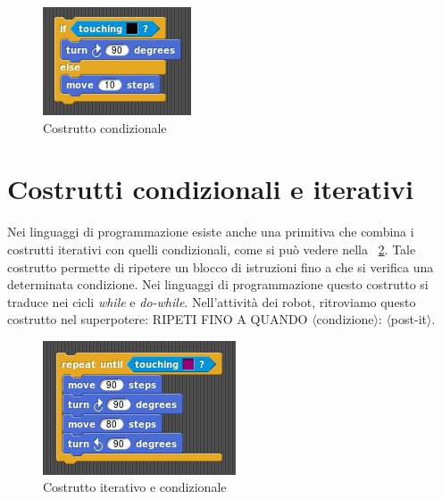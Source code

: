 \documentclass[12pt]{article}
\begin{document}
\begin{figure}
\centering
\includegraphics[scale=0.7]{img/if.jpg}
\caption{Costrutto condizionale}
\label{fig:if}
\end{figure}
%
%
\section{Costrutti condizionali e iterativi}
Nei linguaggi di programmazione esiste anche una primitiva che combina i costrutti iterativi con quelli condizionali, come si può vedere nella \figurename~\ref{fig:while}. Tale costrutto permette di ripetere un blocco di istruzioni fino a che si verifica una determinata condizione. Nei linguaggi di programmazione questo costrutto si traduce nei cicli \textit{while} e \textit{do-while}. Nell'attività dei robot, ritroviamo questo costrutto nel superpotere: RIPETI FINO A QUANDO $\langle$condizione$\rangle$:  $\langle$post-it$\rangle$.

\begin{figure}
\centering
\includegraphics[scale=0.7]{img/while.jpg}
\caption{Costrutto iterativo e condizionale}
\label{fig:while}
\end{figure}
\end{document}
